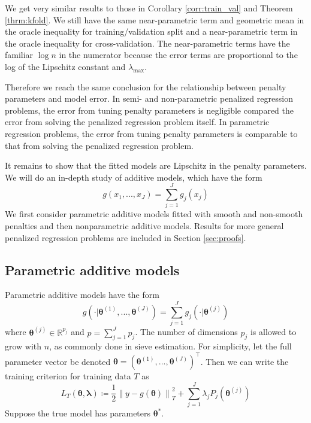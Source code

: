 \documentclass[12pt]{article}
\begin{document}
We get very similar results to those in Corollary \ref{corr:train_val} and Theorem \ref{thrm:kfold}. We still have the same near-parametric term and geometric mean in the oracle inequality for training/validation split and a near-parametric term in the oracle inequality for cross-validation. The near-parametric terms have the familiar $\log n$ in the numerator because the error terms are proportional to the log of the Lipschitz constant and $\lambda_{\max}$. 

Therefore we reach the same conclusion for the relationship between penalty parameters and model error. In semi- and non-parametric penalized regression problems, the error from tuning penalty parameters is negligible compared the error from solving the penalized regression problem itself. In parametric regression problems, the error from tuning penalty parameters is comparable to that from solving the penalized regression problem.

It remains to show that the fitted models are Lipschitz in the penalty parameters. We will do an in-depth study of additive models, which have the form
\begin{equation}
g(x_1, ..., x_J)= \sum_{j=1}^J g_j(x_j)
\end{equation}
We first consider parametric additive models fitted with smooth and non-smooth penalties and then nonparametric additive models. Results for more general penalized regression problems are included in Section \ref{sec:proofs}.


\subsection{Parametric additive models}
\label{sec:param_add_models}
Parametric additive models have the form
\begin{equation}
g(\cdot | \boldsymbol{\theta}^{(1)}, ..., \boldsymbol{\theta}^{(J)}) = \sum_{j=1}^J g_j(\cdot | \boldsymbol{\theta}^{(j)})
\end{equation}
where $\boldsymbol{\theta}^{(j)} \in \mathbb{R}^{p_j}$ and $p = \sum_{j=1}^J p_j$. The number of dimensions $p_j$ is allowed to grow with $n$, as commonly done in sieve estimation. For simplicity, let the full parameter vector be denoted $\boldsymbol{\theta} = \left (\boldsymbol{\theta}^{(1)}, ..., \boldsymbol{\theta}^{(J)} \right )^\top$. Then we can write the training criterion for training data $T$ as
\begin{equation}
\label{eq:param_add}
L_T \left (\boldsymbol{\theta}, \boldsymbol{\lambda} \right) 
\coloneqq \frac{1}{2} \left  \| y -  g(\boldsymbol{\theta}) \right \|^2_T 
+ \sum_{j=1}^J \lambda_j P_j(\boldsymbol{\theta}^{(j)})
\end{equation}
Suppose the true model has parameters $\boldsymbol{\theta}^*$.
\end{document}
